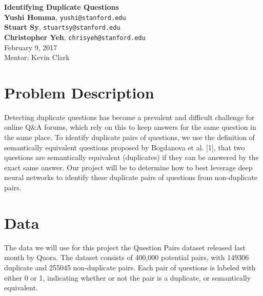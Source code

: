 \documentclass{article}
\begin{document}
\begin{center}
{\Large \textbf{Identifying Duplicate Questions}} \\

\textbf{Yushi Homma}, \texttt{yushi@stanford.edu} \\
\textbf{Stuart Sy}, \texttt{stuartsy@stanford.edu} \\
\textbf{Christopher Yeh}, \texttt{chrisyeh@stanford.edu} \\
February 9, 2017\\
Mentor:  Kevin Clark
\end{center}

\section{Problem Description}
Detecting duplicate questions has become a prevalent and difficult challenge for online Q\&A forums, which rely on this to keep answers for the same question in the same place. To identify duplicate pairs of questions, we use the definition of semantically equivalent questions proposed by Bogdanova et al. [1], that two questions are semantically equivalent (duplicates) if they can be answered by the exact same answer. Our project will be to determine how to best leverage deep neural networks to identify these duplicate pairs of questions from non-duplicate pairs.

\section{Data}
The data we will use for this project the Question Pairs dataset released last month by Quora. The dataset consists of 400,000 potential pairs, with  149306 duplicate and 255045 non-duplicate pairs.
Each pair of questions is labeled with either 0 or 1, indicating whether or not the pair is a duplicate, or semantically equivalent.
\end{document}
